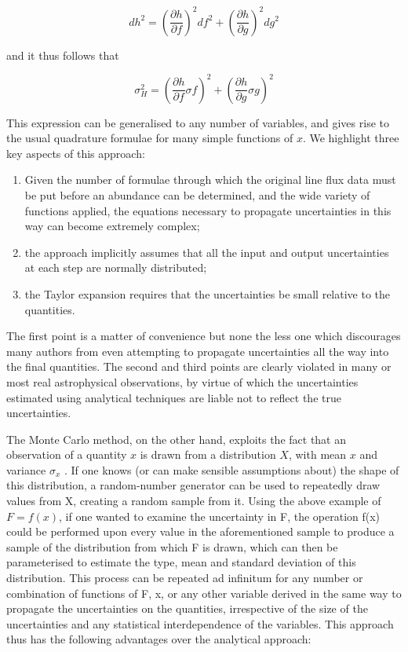 \documentclass[useAMS,usenatbib]{mn2e}
\begin{document}
\begin{equation}
dh^2 = \left(\frac{\partial h}{\partial f}\right)^2df^2 + \left(\frac{\partial h}{\partial g}\right)^2dg^2
\end{equation}

and it thus follows that

\begin{equation}
\sigma^2_H = \left(\frac{\partial h}{\partial f}\sigma f\right)^2 + \left(\frac{\partial h}{\partial g}\sigma g\right)^2
\end{equation}

This expression can be generalised to any number of variables, and gives rise to the usual quadrature formulae for many simple functions of $x$.  We highlight three key aspects of this approach:

\begin{enumerate}
  \item Given the number of formulae through which the original line flux data must be put before an abundance can be determined, and the wide variety of functions applied, the equations necessary to propagate uncertainties in this way can become extremely complex;
  \item the approach implicitly assumes that all the input and output uncertainties at each step are normally distributed;
  \item the Taylor expansion requires that the uncertainties be small relative to the quantities.
\end{enumerate}

The first point is a matter of convenience but none the less one which discourages many authors from even attempting to propagate uncertainties all the way into the final quantities.  The second and third points are clearly violated in many or most real astrophysical observations, by virtue of which the uncertainties estimated using analytical techniques are liable not to reflect the true uncertainties.

The Monte Carlo method, on the other hand, exploits the fact that an observation of a quantity $x$ is drawn from a distribution $X$, with mean $x$ and variance $\sigma_x$ . If one knows (or can make sensible assumptions about) the shape of this distribution, a random-number generator can be used to repeatedly draw values from X, creating a random sample from it. Using the above example of $F = f (x)$, if one wanted to examine the uncertainty in F, the operation f(x) could be performed upon every value in the aforementioned sample to produce a sample of the distribution from which F is drawn, which can then be parameterised to estimate the type, mean and standard deviation of this distribution. This process can be repeated ad infinitum for any number or combination of functions of F, x, or any other variable derived in the same way to propagate the uncertainties on the quantities, irrespective of the size of the uncertainties and any statistical interdependence of the variables.  This approach thus has the following advantages over the analytical approach:
\end{document}
